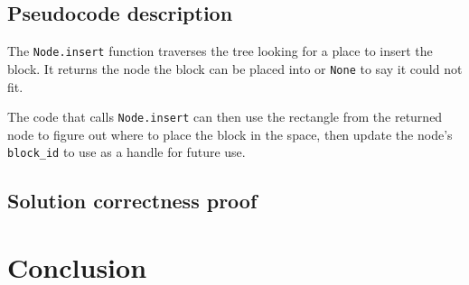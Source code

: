 \subsection{Pseudocode description}
The \texttt{Node.insert} function traverses the tree looking for a place
to insert the block.
It returns the node the block can be placed into or \texttt{None} to say
it could not fit.

The code that calls \texttt{Node.insert} can then use the rectangle
from the returned node to figure out where to place the block in the space,
then update the node's \texttt{block\_id} to use as a handle for future use.

\subsection{Solution correctness proof}

\section{Conclusion}


%

